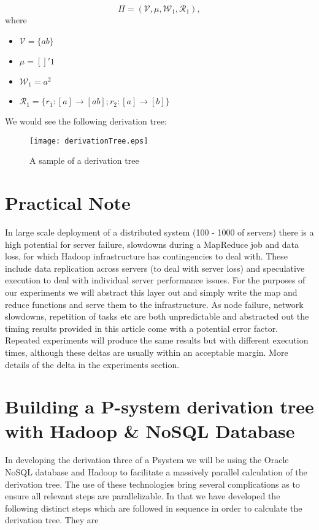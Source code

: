 \documentclass[runningheads]{llncs}
\begin{document}
\begin{equation*}
\Pi = (\mathcal{V},\mu,\mathcal{W}_1,\mathcal{R}_1),
\end{equation*}
where
\begin{itemize}
\item $\mathcal{V} =\{ab\}$
\item $\mu = []'1$ 
\item $\mathcal{W}_1=a^2$
\item $\mathcal{R}_1=\{ r_1 : [a]\rightarrow[ab]; r_2 : [a]\rightarrow[b] \}$
\end{itemize}

We would see the following derivation tree:

\begin{figure}
\texttt{[image: derivationTree.eps]}
\caption{A sample of a derivation tree}
\end{figure}

\section{Practical Note}

In large scale deployment of a distributed system (100 - 1000 of servers) there is a high potential for server  failure, slowdowns during a MapReduce job and data loss, for which Hadoop infrastructure has contingencies to deal with. These include data replication across servers (to deal with server loss) and speculative execution to deal with individual server performance issues. For the purposes of our experiments we will abstract this layer out and simply write the map and reduce functions and serve them to the infrastructure. As node failure, network slowdowns, repetition of tasks etc are both unpredictable and abstracted out the timing results provided in this article come with a potential error factor. Repeated experiments will produce the same results but with different execution times, although these deltas are usually within an acceptable margin. More details of the delta in the experiments section. 

\section{Building a P-system derivation tree with Hadoop \& NoSQL Database}

In developing the derivation three of a Psystem we will be using the Oracle NoSQL database and Hadoop to facilitate a massively parallel calculation of the derivation tree. The use of these technologies bring several complications as to ensure all relevant steps are parallelizable. In that we have developed the following distinct steps which are followed in sequence in order to calculate the derivation tree. They are
\end{document}
